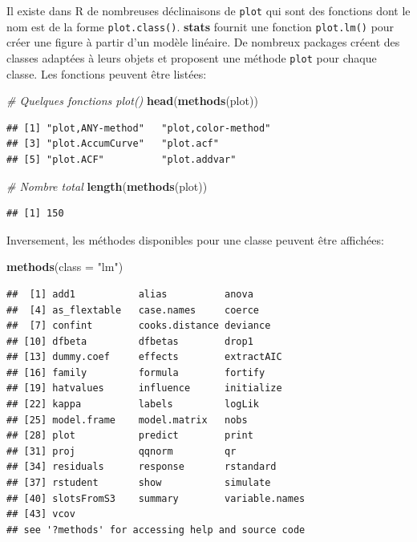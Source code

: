 \documentclass[
  12pt,
  french,
  a4paper,
  extrafontsizes,onecolumn,openright
  ]{memoir}
\newenvironment{Shaded}{\begin{snugshade}}{\end{snugshade}}
\newcommand{\CommentTok}[1]{\textcolor[rgb]{0.56,0.35,0.01}{\textit{#1}}}
\newcommand{\DataTypeTok}[1]{\textcolor[rgb]{0.13,0.29,0.53}{#1}}
\newcommand{\KeywordTok}[1]{\textcolor[rgb]{0.13,0.29,0.53}{\textbf{#1}}}
\newcommand{\NormalTok}[1]{#1}
\newcommand{\StringTok}[1]{\textcolor[rgb]{0.31,0.60,0.02}{#1}}
\begin{document}
\normalsize

Il existe dans R de nombreuses déclinaisons de \texttt{plot} qui sont des fonctions dont le nom est de la forme \texttt{plot.class()}.
\textbf{stats} fournit une fonction \texttt{plot.lm()} pour créer une figure à partir d'un modèle linéaire.
De nombreux packages créent des classes adaptées à leurs objets et proposent une méthode \texttt{plot} pour chaque classe.
Les fonctions peuvent être listées:

\scriptsize

\begin{Shaded}
\begin{Highlighting}[]
\CommentTok{# Quelques fonctions plot()}
\KeywordTok{head}\NormalTok{(}\KeywordTok{methods}\NormalTok{(plot))}
\end{Highlighting}
\end{Shaded}

\begin{verbatim}
## [1] "plot,ANY-method"   "plot,color-method"
## [3] "plot.AccumCurve"   "plot.acf"         
## [5] "plot.ACF"          "plot.addvar"
\end{verbatim}

\begin{Shaded}
\begin{Highlighting}[]
\CommentTok{# Nombre total}
\KeywordTok{length}\NormalTok{(}\KeywordTok{methods}\NormalTok{(plot))}
\end{Highlighting}
\end{Shaded}

\begin{verbatim}
## [1] 150
\end{verbatim}

\normalsize
Inversement, les méthodes disponibles pour une classe peuvent être affichées:

\scriptsize

\begin{Shaded}
\begin{Highlighting}[]
\KeywordTok{methods}\NormalTok{(}\DataTypeTok{class =} \StringTok{"lm"}\NormalTok{)}
\end{Highlighting}
\end{Shaded}

\begin{verbatim}
##  [1] add1           alias          anova         
##  [4] as_flextable   case.names     coerce        
##  [7] confint        cooks.distance deviance      
## [10] dfbeta         dfbetas        drop1         
## [13] dummy.coef     effects        extractAIC    
## [16] family         formula        fortify       
## [19] hatvalues      influence      initialize    
## [22] kappa          labels         logLik        
## [25] model.frame    model.matrix   nobs          
## [28] plot           predict        print         
## [31] proj           qqnorm         qr            
## [34] residuals      response       rstandard     
## [37] rstudent       show           simulate      
## [40] slotsFromS3    summary        variable.names
## [43] vcov          
## see '?methods' for accessing help and source code
\end{verbatim}
\end{document}
